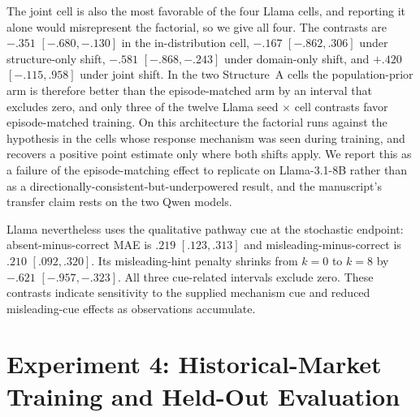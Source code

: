 The joint cell is also the most favorable of the four Llama cells, and
reporting it alone would misrepresent the factorial, so we give all four. The
contrasts are $-.351$ $[-.680,-.130]$ in the in-distribution cell, $-.167$
$[-.862,.306]$ under structure-only shift, $-.581$ $[-.868,-.243]$ under
domain-only shift, and $+.420$ $[-.115,.958]$ under joint shift. In the two
Structure~A cells the population-prior arm is therefore better than the
episode-matched arm by an interval that excludes zero, and only three of the twelve
Llama seed $\times$ cell contrasts favor episode-matched training. On this
architecture the factorial runs against the hypothesis in the cells
whose response mechanism was seen during training, and recovers a positive point
estimate only where both shifts apply. We report this as a failure of the
episode-matching effect to replicate on Llama-3.1-8B rather than as a
directionally-consistent-but-underpowered result, and the manuscript's transfer
claim rests on the two Qwen models.

Llama nevertheless uses the qualitative
pathway cue at the stochastic endpoint:
absent-minus-correct MAE is $.219$ $[.123,.313]$ and
misleading-minus-correct is $.210$ $[.092,.320]$. Its misleading-hint penalty
shrinks from $k=0$ to $k=8$ by $-.621$ $[-.957,-.323]$. All three cue-related
intervals exclude zero. These contrasts indicate sensitivity to the supplied
mechanism cue and reduced misleading-cue effects as observations accumulate.

\begin{center}
\begin{minipage}{\linewidth}
\centering
{}
\label{tab:exp3-coin-complete-roster}
\scriptsize
\setlength{\tabcolsep}{3pt}
\resizebox{\linewidth}{!}{}
\end{minipage}
\end{center}

\section{Experiment 4: Historical-Market Training and Held-Out Evaluation}
\label{app:exp4}
\label{app:exp3b-protocol}

